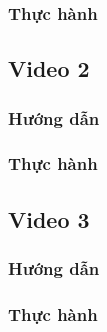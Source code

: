 \documentclass{article}
\begin{document}



\subsubsection{Thực hành}



\subsection{Video 2}
\subsubsection{Hướng dẫn}

\subsubsection{Thực hành}




\subsection{Video 3}
\subsubsection{Hướng dẫn}

\subsubsection{Thực hành}
\end{document}
